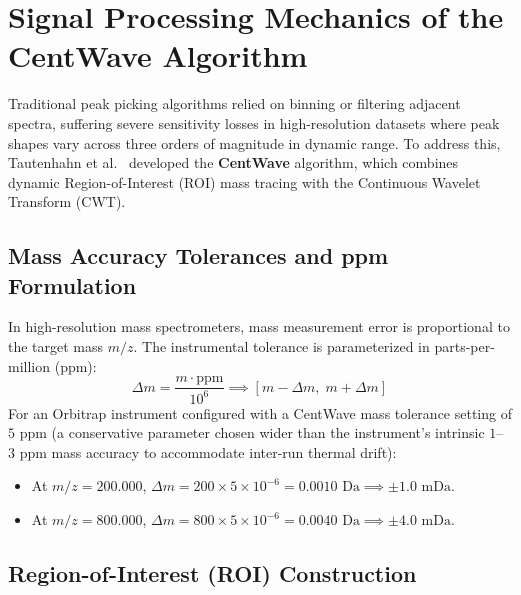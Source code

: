 \documentclass[11pt,twoside,openright]{book}
\begin{document}
\section{Signal Processing Mechanics of the CentWave Algorithm}

Traditional peak picking algorithms relied on binning or filtering adjacent spectra, suffering severe sensitivity losses in high-resolution datasets where peak shapes vary across three orders of magnitude in dynamic range. To address this, Tautenhahn et al.~\cite{tautenhahn2008highly} developed the \textbf{CentWave} algorithm, which combines dynamic Region-of-Interest (ROI) mass tracing with the Continuous Wavelet Transform (CWT).

\subsection{Mass Accuracy Tolerances and ppm Formulation}

In high-resolution mass spectrometers, mass measurement error is proportional to the target mass $m/z$. The instrumental tolerance is parameterized in parts-per-million ($\text{ppm}$):
\begin{equation}
\label{eq:ppm_def}
\Delta m = \frac{m \cdot \text{ppm}}{10^6} \implies [m - \Delta m, \; m + \Delta m]
\end{equation}
For an Orbitrap instrument configured with a CentWave mass tolerance setting of $5\text{ ppm}$ (a conservative parameter chosen wider than the instrument's intrinsic $1$--$3\text{ ppm}$ mass accuracy to accommodate inter-run thermal drift):
\begin{itemize}
    \item At $m/z = 200.000$, $\Delta m = 200 \times 5 \times 10^{-6} = 0.0010\text{ Da} \implies \pm 1.0\text{ mDa}$.
    \item At $m/z = 800.000$, $\Delta m = 800 \times 5 \times 10^{-6} = 0.0040\text{ Da} \implies \pm 4.0\text{ mDa}$.
\end{itemize}

\subsection{Region-of-Interest (ROI) Construction}
\end{document}
